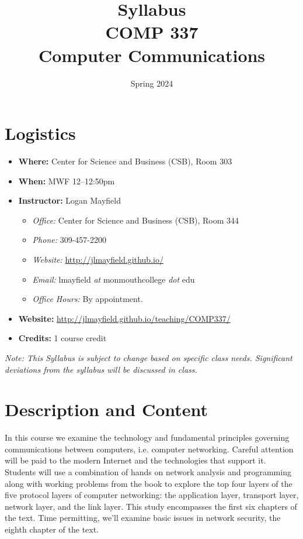 \documentclass[10pt]{article}
\title{Syllabus \\ COMP 337 \\ Computer Communications}
\author{  }
\date{Spring 2024}
\begin{document}
\maketitle

\section{Logistics}
\begin{itemize}
\item \textbf{Where: }Center for Science and Business (CSB), Room 303
\item \textbf{When: } MWF 12--12:50pm
\item \textbf{Instructor: } Logan Mayfield
\begin{itemize}
\item \textit{Office: } Center for Science and Business (CSB), Room 344
\item \textit{Phone: } 309-457-2200 %
\item \textit{Website: } \url{http://jlmayfield.github.io/}
\item \textit{Email: } lmayfield \textit{at} monmouthcollege \textit{dot} edu
\item \textit{Office Hours: }  By appointment.
\end{itemize}
\item \textbf{Website: } \url{http://jlmayfield.github.io/teaching/COMP337/}
\item \textbf{Credits: } 1 course credit
\end{itemize}
\emph{Note: This Syllabus is subject to change based on specific class needs. Significant deviations from the syllabus will be discussed in class.}



\section{Description and Content}

In this course we examine the technology and fundamental principles governing communications between computers, i.e. computer networking. Careful attention will be paid to the modern Internet and the technologies that support it.  Students will use a combination of hands on network analysis and programming along with working problems from the book to explore the top four layers of the five protocol layers of computer networking: the application layer, transport layer, network layer, and the link layer. This study encompasses the first six chapters of the text. Time permitting, we'll examine basic issues in network security, the eighth chapter of the text.
\end{document}

